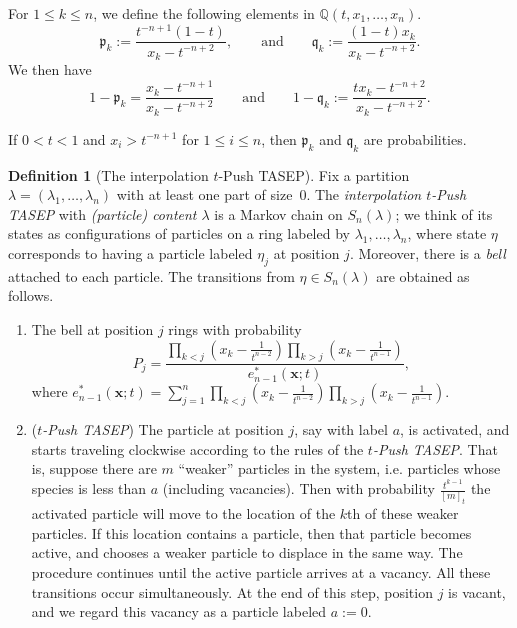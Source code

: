 \documentclass[12pt]{amsart}
\theoremstyle{definition}
\newtheorem{definition}[thm]{Definition}
\newcommand{\bfx}{\boldsymbol{x}}
\newcommand{\QQ}{\mathbb Q}
\newcommand{\mfp}{\mathfrak p}
\newcommand{\mfq}{\mathfrak q}
\begin{document}
 For $1\leq k\leq n$, we define the following elements in $\QQ(t,x_1,\dots,x_n)$.
$$\mfp_k:=\frac{t^{-n+1}(1-t)}{x_k-t^{-n+2}}, \qquad \text{and}\qquad \mfq_k:= \frac{(1-t)x_k}{x_k-t^{-n+2}}.$$
We then have
\begin{equation}\label{eq:1minuspk}
1-\mfp_k=\frac{x_k-t^{-n+1}}{x_k-t^{-n+2}} \qquad \text{and}\qquad 1-\mfq_k:= \frac{t x_k-t^{-n+2}}{x_k-t^{-n+2}}.
\end{equation}

If  $0<t<1$ and $x_i>t^{-n+1}$ for $1\leq i\leq n$, then $\mfp_k$ and $\mfq_k$ are probabilities. 

\begin{definition}[The interpolation $t$-Push TASEP]\label{def:intpushTASEP}
Fix a partition $\lambda=(\lambda_1,\dots,\lambda_n)$ with at least one part of size~0.
The \emph{interpolation $t$-Push TASEP} with 
\emph{(particle) content $\lambda$} is a Markov chain
on $S_n(\lambda)$; we think of its states as configurations of particles on a ring labeled by $\lambda_1,\dots, \lambda_n$, where state $\eta$ corresponds to having  a particle labeled $\eta_j$ at position $j$.  Moreover, there is a \emph{bell} attached to each particle.
The transitions from $\eta\in S_n(\lambda)$ are obtained as follows.
\begin{enumerate}[label=(Step \arabic*)]
   \item[(Step 0)]\label{Step0} The bell at position $j$ rings with probability 
   $$P_j
   =\frac{\prod_{k<j}\left(x_k-\frac{1}{t^{n-2}}\right)\prod_{k>j}\left(x_k-\frac{1}{t^{n-1}}\right)}{e^*_{n-1}(\bfx;t)}, $$
   where 
   $e^*_{n-1}(\bfx;t)=\sum_{j=1}^n\prod_{k<j}\left(x_k-\frac{1}{t^{n-2}}\right)\prod_{k>j}\left(x_k-\frac{1}{t^{n-1}}\right)$.
      \item\label{Step1}(\emph{$t$-Push TASEP})
        The particle at position $j$, say with label $a$, is activated, and starts traveling clockwise according to the rules of the \emph{$t$-Push TASEP}.  That is, suppose  there are $m$ ``weaker'' particles in the system, i.e. particles whose species is less than $a$ (including vacancies). 
   Then with probability $\frac{t^{k-1}}{[m]_t}$ the activated particle will move to the location of the $k$th of these weaker particles.  If this location contains a particle, then that particle becomes active, and chooses a weaker particle to displace in the same way.  The procedure continues until the active particle arrives at a vacancy.  All these transitions occur simultaneously.   
   At the end of this step, position $j$ is vacant, and 
   we regard this vacancy as a particle labeled $a:=0$.


\end{enumerate}
\end{definition}
\end{document}

